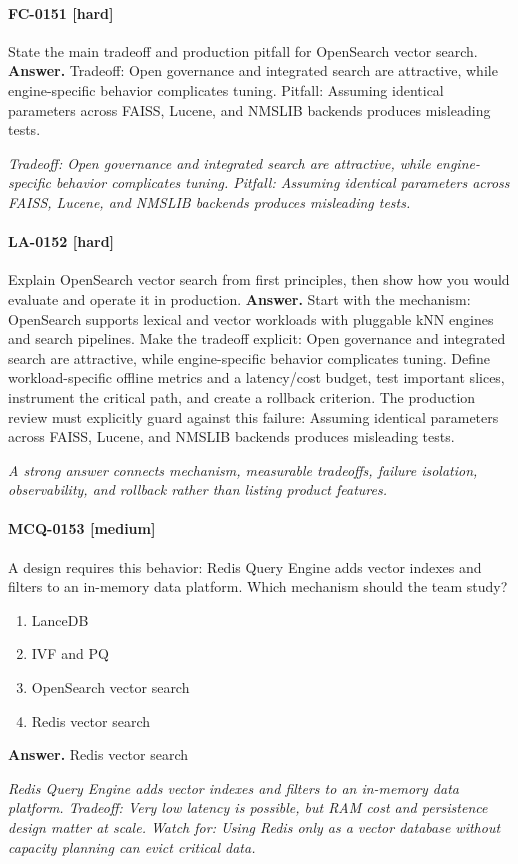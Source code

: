 \paragraph{FC-0151 [hard]} State the main tradeoff and production pitfall for OpenSearch vector search.
\noindent\textbf{Answer.} Tradeoff: Open governance and integrated search are attractive, while engine-specific behavior complicates tuning. Pitfall: Assuming identical parameters across FAISS, Lucene, and NMSLIB backends produces misleading tests.
\par\textit{Tradeoff: Open governance and integrated search are attractive, while engine-specific behavior complicates tuning. Pitfall: Assuming identical parameters across FAISS, Lucene, and NMSLIB backends produces misleading tests.}
\paragraph{LA-0152 [hard]} Explain OpenSearch vector search from first principles, then show how you would evaluate and operate it in production.
\noindent\textbf{Answer.} Start with the mechanism: OpenSearch supports lexical and vector workloads with pluggable kNN engines and search pipelines. Make the tradeoff explicit: Open governance and integrated search are attractive, while engine-specific behavior complicates tuning. Define workload-specific offline metrics and a latency/cost budget, test important slices, instrument the critical path, and create a rollback criterion. The production review must explicitly guard against this failure: Assuming identical parameters across FAISS, Lucene, and NMSLIB backends produces misleading tests.
\par\textit{A strong answer connects mechanism, measurable tradeoffs, failure isolation, observability, and rollback rather than listing product features.}
\paragraph{MCQ-0153 [medium]} A design requires this behavior: Redis Query Engine adds vector indexes and filters to an in-memory data platform. Which mechanism should the team study?
\begin{enumerate}[label=\Alph*.]
\item LanceDB
\item IVF and PQ
\item OpenSearch vector search
\item Redis vector search
\end{enumerate}
\noindent\textbf{Answer.} Redis vector search
\par\textit{Redis Query Engine adds vector indexes and filters to an in-memory data platform. Tradeoff: Very low latency is possible, but RAM cost and persistence design matter at scale. Watch for: Using Redis only as a vector database without capacity planning can evict critical data.}
